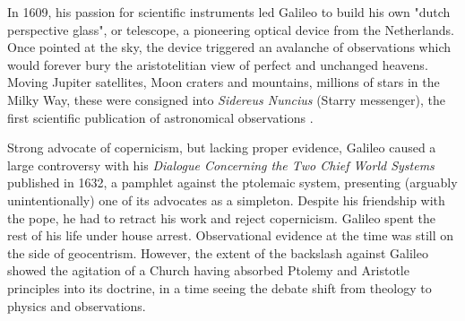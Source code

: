 In 1609, his passion for scientific instruments led Galileo to build his own "dutch perspective glass", or telescope, a pioneering optical device from the Netherlands. Once pointed at the sky, the device triggered an avalanche of observations which would forever bury the aristotelitian view of perfect and unchanged heavens. Moving Jupiter satellites, Moon craters and mountains, millions of stars in the Milky Way, these were consigned into \textit{Sidereus Nuncius} (Starry messenger), the first scientific publication of astronomical observations \citep{galileo1610}.

Strong advocate of copernicism, but lacking proper evidence, Galileo caused a large controversy with his 
\textit{Dialogue Concerning the Two Chief World Systems} published in 1632, a pamphlet against the ptolemaic system, presenting (arguably unintentionally) one of its advocates as a simpleton. Despite his friendship with the pope, he had to retract his work and reject copernicism. Galileo spent the rest of his life under house arrest. Observational evidence at the time was still on the side of geocentrism. However, the extent of the backslash against Galileo showed the agitation of a Church having absorbed Ptolemy and Aristotle principles into its doctrine, in a time seeing the debate shift from theology to physics and observations.

